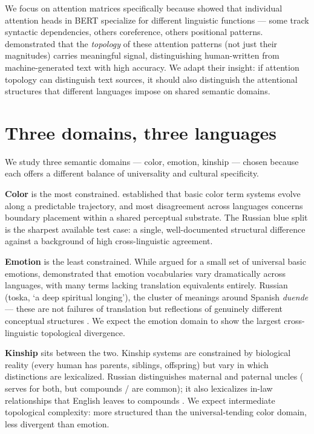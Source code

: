 We focus on attention matrices specifically because \textcite{clark2019} showed that individual attention heads in BERT specialize for different linguistic functions --- some track syntactic dependencies, others coreference, others positional patterns. \textcite{kushnareva2021} demonstrated that the \emph{topology} of these attention patterns (not just their magnitudes) carries meaningful signal, distinguishing human-written from machine-generated text with high accuracy. We adapt their insight: if attention topology can distinguish text sources, it should also distinguish the attentional structures that different languages impose on shared semantic domains.

\section{Three domains, three languages}

We study three semantic domains --- color, emotion, kinship --- chosen because each offers a different balance of universality and cultural specificity.

\textbf{Color} is the most constrained. \textcite{berlin1969} established that basic color term systems evolve along a predictable trajectory, and most disagreement across languages concerns boundary placement within a shared perceptual substrate. The Russian blue split is the sharpest available test case: a single, well-documented structural difference against a background of high cross-linguistic agreement.

\textbf{Emotion} is the least constrained. While \textcite{ekman1992} argued for a small set of universal basic emotions, \textcite{wierzbicka1999} demonstrated that emotion vocabularies vary dramatically across languages, with many terms lacking translation equivalents entirely. Russian  (toska, `a deep spiritual longing'), the cluster of meanings around Spanish \emph{duende} --- these are not failures of translation but reflections of genuinely different conceptual structures \parencite{pavlenko2005}. We expect the emotion domain to show the largest cross-linguistic topological divergence.

\textbf{Kinship} sits between the two. Kinship systems are constrained by biological reality (every human has parents, siblings, offspring) but vary in which distinctions are lexicalized. Russian distinguishes maternal and paternal uncles ( serves for both, but compounds / are common); it also lexicalizes in-law relationships that English leaves to compounds \parencite{friedrich1964, murdock1949}. We expect intermediate topological complexity: more structured than the universal-tending color domain, less divergent than emotion.

